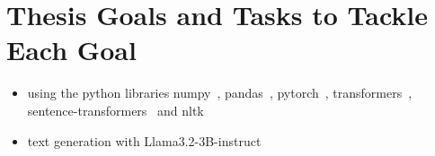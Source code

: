 
\section{Thesis Goals and Tasks to Tackle Each Goal}

\begin{itemize}
  \item using the python libraries numpy~\cite{harris2020array}, pandas~\cite{reback2020pandas,mckinney-proc-scipy-2010}, pytorch~\cite{paszkePyTorchImperativeStyle2019}, transformers~\cite{wolfHuggingFacesTransformersStateart2020}, sentence-transformers~\cite{reimersSentenceBERTSentenceEmbeddings2019} and nltk~\cite{birdNaturalLanguageProcessing2009}
  \item text generation with Llama3.2-3B-instruct~\cite{dubeyLlama3Herd2024}
\end{itemize}
